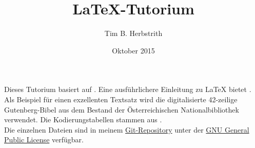 \documentclass[a4paper]{article}
\author{Tim B. Herbstrith}
\title{\LaTeX-Tutorium}
\date{Oktober 2015}
\begin{document}
	\maketitle
	
	Dieses Tutorium basiert auf \cite{l2short}.
	Eine ausführlichere Einleitung zu \LaTeX{} bietet \cite{texbuch}.\\
	
	Als Beispiel für einen exzellenten Textsatz wird die 
	digitalisierte 42-zeilige Gutenberg-Bibel \cite{gutenberg} 
	aus dem Bestand der Österreichischen Nationalbibliothek verwendet. 
	Die Kodierungstabellen stammen aus \cite{encodings}.\\
	
	Die einzelnen Dateien sind in meinem
	\href{https://github.com/tim6her/BAS1}{Git-Repository}
	unter der 
	\href{http://www.gnu.org/licenses/gpl.html}{GNU General Public License}
	verfügbar.
	
	\printbibliography
\end{document}
